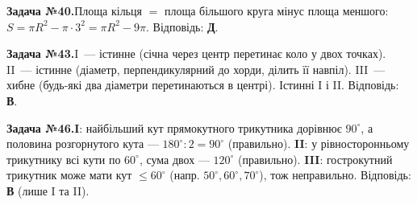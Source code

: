 \documentclass[12pt]{article}
\begin{document}
\par\vspace{0.3cm}\noindent\hypertarget{sol:40}{}
\begin{tcolorbox}[colback=titleBg!40, colframe=mainGreen!55, boxrule=0.4pt, arc=2pt, left=6pt, right=6pt, top=4pt, bottom=4pt, breakable]
\noindent\small\textbf{Задача №40.}\quad Площа кільця $=$ площа більшого круга мінус площа меншого: $S=\pi R^2-\pi\cdot3^2=\pi R^2-9\pi$. Відповідь: \textbf{Д}.
\par\vspace{0.1cm}\hfill\hyperlink{task:40}{}
\end{tcolorbox}
\par\vspace{0.3cm}\noindent\hypertarget{sol:43}{}
\begin{tcolorbox}[colback=titleBg!40, colframe=mainGreen!55, boxrule=0.4pt, arc=2pt, left=6pt, right=6pt, top=4pt, bottom=4pt, breakable]
\noindent\small\textbf{Задача №43.}\quad I~--- істинне (січна через центр перетинає коло у двох точках). II~--- істинне (діаметр, перпендикулярний до хорди, ділить її навпіл). III~--- хибне (будь-які два діаметри перетинаються в центрі). Істинні I і II. Відповідь: \textbf{В}.
\par\vspace{0.1cm}\hfill\hyperlink{task:43}{}
\end{tcolorbox}
\par\vspace{0.3cm}\noindent\hypertarget{sol:46}{}
\begin{tcolorbox}[colback=titleBg!40, colframe=mainGreen!55, boxrule=0.4pt, arc=2pt, left=6pt, right=6pt, top=4pt, bottom=4pt, breakable]
\noindent\small\textbf{Задача №46.}\quad \textbf{I}: найбільший кут прямокутного трикутника дорівнює $90^\circ$, а половина розгорнутого кута — $180^\circ:2=90^\circ$ (правильно). \textbf{II}: у рівносторонньому трикутнику всі кути по $60^\circ$, сума двох — $120^\circ$ (правильно). \textbf{III}: гострокутний трикутник може мати кут $\le60^\circ$ (напр. $50^\circ,60^\circ,70^\circ$), тож неправильно. Відповідь: \textbf{В} (лише I та II).
\par\vspace{0.1cm}\hfill\hyperlink{task:46}{}
\end{tcolorbox}
\par\vspace{0.3cm}\noindent\hypertarget{sol:49}{}
\end{document}
